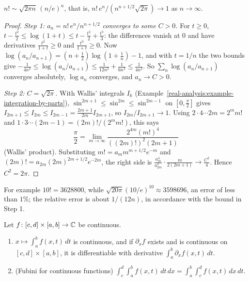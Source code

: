 \begin{theorem}\label{real-analysis:theorem-stirling}
$n! \sim \sqrt{2\pi n}\,(n/e)^n$, that is, $n!\,e^n/(n^{n + 1/2}\sqrt{2\pi}) \to 1$ as $n \to \infty$.
\end{theorem}

\begin{proof}
\emph{Step 1: $a_n = n!\,e^n/n^{n + 1/2}$ converges to some $C > 0$.} For $t \geq 0$, $t - \frac{t^2}2 \leq \log(1 + t) \leq t - \frac{t^2}2 + \frac{t^3}3$: the differences vanish at $0$ and have
derivatives $\frac{t^2}{1 + t} \geq 0$ and $\frac{t^3}{1 + t} \geq 0$. Now $\log(a_n/a_{n+1}) = (n + \frac12)\log(1 + \frac1n) - 1$, and with $t = 1/n$ the two bounds give
$-\frac{1}{4n^2} \leq \log(a_n/a_{n+1}) \leq \frac{1}{12n^2} + \frac{1}{6n^3} \leq \frac{1}{4n^2}$. So $\sum_n\log(a_n/a_{n+1})$ converges absolutely, $\log a_n$ converges, and $a_n \to C > 0$.

\emph{Step 2: $C = \sqrt{2\pi}$.} With Wallis' integrals $I_k$ (Example~\ref{real-analysis:example-integration-by-parts}), $\sin^{2m+1} \leq \sin^{2m} \leq \sin^{2m-1}$ on $[0, \frac\pi2]$ gives
$I_{2m+1} \leq I_{2m} \leq I_{2m-1} = \frac{2m+1}{2m}I_{2m+1}$, so $I_{2m}/I_{2m+1} \to 1$. Using $2 \cdot 4 \cdots 2m = 2^mm!$ and $1 \cdot 3 \cdots (2m - 1) = (2m)!/(2^mm!)$, this says
\[
\frac\pi2 = \lim_{m \to \infty}\frac{2^{4m}(m!)^4}{((2m)!)^2(2m + 1)}
\]
(Wallis' product). Substituting $m! = a_mm^{m + 1/2}e^{-m}$ and $(2m)! = a_{2m}(2m)^{2m + 1/2}e^{-2m}$, the right side is $\frac{a_m^4}{a_{2m}^2}\cdot\frac{m}{2(2m + 1)} \to \frac{C^2}{4}$. Hence
$C^2 = 2\pi$.
\end{proof}

For example $10! = 3628800$, while $\sqrt{20\pi}(10/e)^{10} \approx 3598696$, an error of less than $1\%$; the relative error is about $1/(12n)$, in accordance with the bound in Step 1.

\begin{proposition}\label{real-analysis:proposition-parameter-integrals}
Let $f \colon [c, d] \times [a, b] \to \mathbb{C}$ be continuous.
\begin{enumerate}
\item $x \mapsto \int_a^bf(x, t)\,dt$ is continuous, and if $\partial_xf$ exists and is continuous on $[c, d] \times [a, b]$, it is differentiable with derivative $\int_a^b\partial_xf(x, t)\,dt$.
\item (Fubini for continuous functions) $\int_c^d\int_a^bf(x, t)\,dt\,dx = \int_a^b\int_c^df(x, t)\,dx\,dt$.
\end{enumerate}
\end{proposition}

